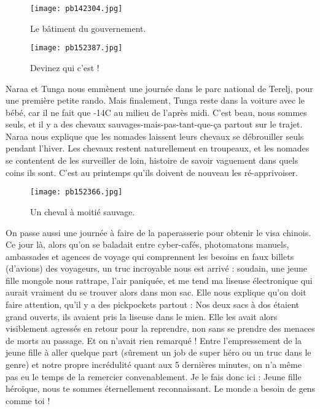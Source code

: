 \documentclass{book}
\begin{document}
\begin{figure}[h]
\centering
\texttt{[image: pb142304.jpg]}
\caption*{ Le bâtiment du gouvernement.}
\end{figure}


\begin{figure}[h]
\centering
\texttt{[image: pb152387.jpg]}
\caption*{ Devinez qui c'est !}
\end{figure}

Naraa et Tunga nous emmènent une journée dans le parc national de Terelj, pour une première petite rando. Mais finalement, Tunga reste dans la voiture avec le bébé, car il ne fait que -14\textdegree C au milieu de l'après midi. C'est beau, nous sommes seuls, et il y a des chevaux sauvages-mais-pas-tant-que-ça partout sur le trajet. Naraa nous explique que les nomades laissent leurs chevaux se débrouiller seuls pendant l'hiver. Les chevaux restent naturellement en troupeaux, et les nomades se contentent de les surveiller de loin, histoire de savoir vaguement dans quels coins ils sont. C'est au printemps qu'ils doivent de nouveau les ré-apprivoiser.


\begin{figure}[h]
\centering
\texttt{[image: pb152366.jpg]}
\caption*{ Un cheval à moitié sauvage.}
\end{figure}

On passe aussi une journée à faire de la paperasserie pour obtenir le visa chinois. Ce jour là, alors qu'on se baladait entre cyber-cafés, photomatons manuels, ambassades et agences de voyage qui comprennent les besoins en faux billets (d'avions) des voyageurs, un truc incroyable nous est arrivé : soudain, une jeune fille mongole nous rattrape, l'air paniquée, et me tend ma liseuse électronique qui aurait vraiment du se trouver alors dans mon sac. Elle nous explique qu'on doit faire attention, qu'il y a des pickpockets partout : Nos deux sacs à dos étaient grand ouverts, ils avaient pris la liseuse dans le mien. Elle les avait alors visiblement agressés en retour pour la reprendre, non sans se prendre des menaces de morts au passage. Et on n'avait rien remarqué ! Entre l'empressement de la jeune fille à aller quelque part (sûrement un job de super héro ou un truc dans le genre) et notre propre incrédulité quant aux 5 dernières minutes, on n'a même pas eu le temps de la remercier convenablement. Je le fais donc ici : Jeune fille héroïque, nous te sommes éternellement reconnaissant. Le monde a besoin de gens comme toi !
\end{document}

